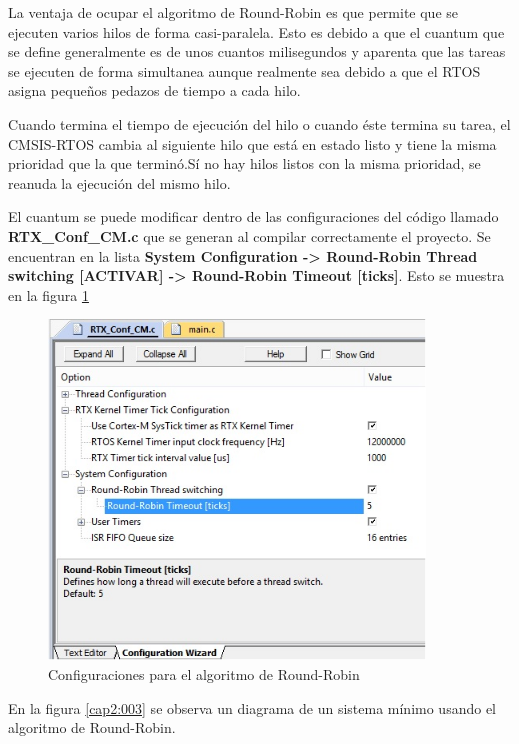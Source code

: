 \documentclass[12pt, twoside]{report}
\begin{document}
La ventaja de ocupar el algoritmo de Round-Robin es que permite que se ejecuten varios hilos de forma casi-paralela. Esto es debido a que el cuantum que se define generalmente es de unos cuantos milisegundos y aparenta que las tareas se ejecuten de forma simultanea aunque realmente sea debido a que el RTOS asigna pequeños pedazos de tiempo a cada hilo.

Cuando termina el tiempo de ejecución del hilo o cuando éste termina su tarea, el CMSIS-RTOS cambia al siguiente hilo que está en estado listo y tiene la misma prioridad que la que terminó.Sí no hay hilos listos con la misma prioridad, se reanuda la ejecución del mismo hilo.

El cuantum se puede modificar dentro de las configuraciones del código llamado \textbf{RTX\_Conf\_CM.c} que se generan al compilar correctamente el proyecto. Se encuentran en la lista \textbf{System Configuration -> Round-Robin Thread switching [ACTIVAR] -> Round-Robin Timeout [ticks]}. Esto se muestra en la figura \ref{cap2:002}

\begin{figure}[H]
	\centering
	\includegraphics[width=100mm]{confround}
	\caption{Configuraciones para el algoritmo de Round-Robin}
	\label{cap2:002}
\end{figure}

En la figura \ref{cap2:003} se observa un diagrama de un sistema mínimo usando el algoritmo de Round-Robin.
\end{document}
